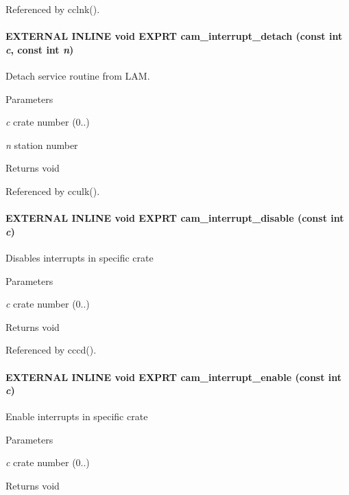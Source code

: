 Referenced by cclnk().
\paragraph[{cam\_\-interrupt\_\-detach}]{\setlength{\rightskip}{0pt plus 5cm}EXTERNAL INLINE void EXPRT cam\_\-interrupt\_\-detach (const int {\em c}, \/  const int {\em n})}\hfill\label{group__mcstdfunctionh_ga0abf493fdf6fac4a8dd284d5998e6b30}
Detach service routine from LAM. 
\begin{DoxyParams}{Parameters}
\item[{\em c}]crate number (0..) \item[{\em n}]station number \end{DoxyParams}
\begin{DoxyReturn}{Returns}
void 
\end{DoxyReturn}


Referenced by cculk().
\paragraph[{cam\_\-interrupt\_\-disable}]{\setlength{\rightskip}{0pt plus 5cm}EXTERNAL INLINE void EXPRT cam\_\-interrupt\_\-disable (const int {\em c})}\hfill\label{group__mcstdfunctionh_ga21c6d5bd474679bf5a810560564c7677}
Disables interrupts in specific crate 
\begin{DoxyParams}{Parameters}
\item[{\em c}]crate number (0..) \end{DoxyParams}
\begin{DoxyReturn}{Returns}
void 
\end{DoxyReturn}


Referenced by cccd().
\paragraph[{cam\_\-interrupt\_\-enable}]{\setlength{\rightskip}{0pt plus 5cm}EXTERNAL INLINE void EXPRT cam\_\-interrupt\_\-enable (const int {\em c})}\hfill\label{group__mcstdfunctionh_ga5d95207e772c732839b0010706c1ecc9}
Enable interrupts in specific crate 
\begin{DoxyParams}{Parameters}
\item[{\em c}]crate number (0..) \end{DoxyParams}
\begin{DoxyReturn}{Returns}
void 
\end{DoxyReturn}


